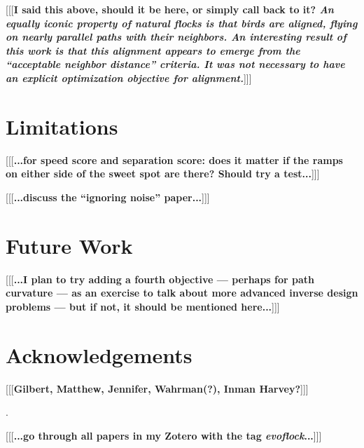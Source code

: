 \documentclass[letterpaper]{article}
\begin{document}
[[[\textbf{I said this above, should it be here, or simply call back to it? \textit{An equally iconic property of natural flocks is that birds are aligned, flying on nearly parallel paths with their neighbors. An interesting result of this work is that this alignment appears to \textit{emerge} from the ``acceptable neighbor distance'' criteria. It was \textbf{not} necessary to have an explicit optimization objective for alignment.}}]]]

\section{Limitations}
\label{sec:limitations}

[[[\textbf{...for speed score and separation score: does it matter if the ramps on either side of the sweet spot are there? Should try a test...}]]]

[[[\textbf{...discuss the ``ignoring noise'' paper...}]]]

\section{Future Work}
\label{sec:future}

[[[\textbf{...I plan to try adding a fourth objective --- perhaps for path curvature --- as an exercise to talk about more advanced inverse design problems --- but if not, it should be mentioned here...}]]]

\section{Acknowledgements}
\label{sec:ack}

[[[\textbf{Gilbert, Matthew, Jennifer, Wahrman(?), Inman Harvey?}]]]


.

[[[\textbf{...go through all papers in my Zotero with the tag \textit{evoflock}...}]]]
\end{document}
